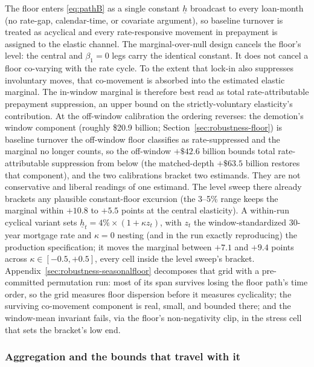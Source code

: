 \documentclass[12pt]{article}
\begin{document}
The floor enters \eqref{eq:pathB} as a single constant $\underline{h}$ broadcast to every loan-month (no rate-gap, calendar-time, or covariate argument), so baseline turnover is treated as acyclical and every rate-responsive movement in prepayment is assigned to the elastic channel. The marginal-over-null design cancels the floor's level: the central and $\beta_1 = 0$ legs carry the identical constant. It does not cancel a floor co-varying with the rate cycle. To the extent that lock-in also suppresses involuntary moves, that co-movement is absorbed into the estimated elastic marginal. The in-window marginal is therefore best read as total rate-attributable prepayment suppression, an upper bound on the strictly-voluntary elasticity's contribution. At the off-window calibration the ordering reverses: the demotion's window component (roughly \$20.9 billion; Section~\ref{sec:robustness-floor}) is baseline turnover the off-window floor classifies as rate-suppressed and the marginal no longer counts, so the off-window $+\$42.6$ billion bounds total rate-attributable suppression from below (the matched-depth $+\$63.5$ billion restores that component), and the two calibrations bracket two estimands. They are not conservative and liberal readings of one estimand. The level sweep there already brackets any plausible constant-floor excursion (the 3--5\% range keeps the marginal within $+10.8$ to $+5.5$ points at the central elasticity). A within-run cyclical variant sets $\underline{h}_t = 4\% \times (1 + \kappa z_t)$, with $z_t$ the window-standardized 30-year mortgage rate and $\kappa = 0$ nesting (and in the run exactly reproducing) the production specification; it moves the marginal between $+7.1$ and $+9.4$ points across $\kappa \in [-0.5, +0.5]$, every cell inside the level sweep's bracket. Appendix~\ref{sec:robustness-seasonalfloor} decomposes that grid with a pre-committed permutation run: most of its span survives losing the floor path's time order, so the grid measures floor dispersion before it measures cyclicality; the surviving co-movement component is real, small, and bounded there; and the window-mean invariant fails, via the floor's non-negativity clip, in the stress cell that sets the bracket's low end.

\subsubsection{Aggregation and the bounds that travel with it}
\end{document}
